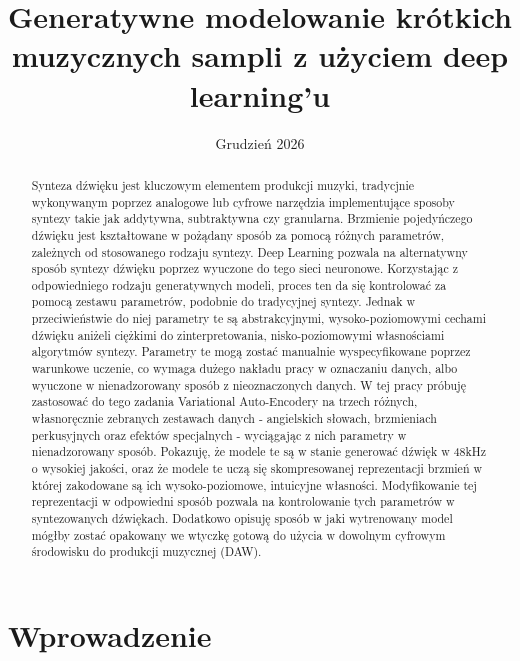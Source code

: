 \documentclass[magisterska]{pracamgr}
\title{Generatywne modelowanie krótkich muzycznych sampli z użyciem deep learning'u}
\date{Grudzień 2026}
\begin{document}
\maketitle

\begin{abstract}
    Synteza dźwięku jest kluczowym elementem produkcji muzyki, tradycjnie wykonywanym poprzez analogowe lub cyfrowe narzędzia implementujące sposoby syntezy takie jak addytywna, subtraktywna czy granularna. Brzmienie pojedyńczego dźwięku jest kształtowane w pożądany sposób za pomocą różnych parametrów, zależnych od stosowanego rodzaju syntezy. Deep Learning pozwala na alternatywny sposób syntezy dźwięku poprzez wyuczone do tego sieci neuronowe. Korzystając z odpowiedniego rodzaju generatywnych modeli, proces ten da się kontrolować za pomocą zestawu parametrów, podobnie do tradycyjnej syntezy. Jednak w przeciwieństwie do niej parametry te są abstrakcyjnymi, wysoko-poziomowymi cechami dźwięku aniżeli ciężkimi do zinterpretowania, nisko-poziomowymi własnościami algorytmów syntezy. Parametry te mogą zostać manualnie wyspecyfikowane poprzez warunkowe uczenie, co wymaga dużego nakładu pracy w oznaczaniu danych, albo wyuczone w nienadzorowany sposób z nieoznaczonych danych. W tej pracy próbuję zastosować do tego zadania Variational Auto-Encodery na trzech różnych, własnoręcznie zebranych zestawach danych - angielskich słowach, brzmieniach perkusyjnych oraz efektów specjalnych - wyciągając z nich parametry w nienadzorowany sposób. Pokazuję, że modele te są w stanie generować dźwięk w 48kHz o wysokiej jakości, oraz że modele te uczą się skompresowanej reprezentacji brzmień w której zakodowane są ich wysoko-poziomowe, intuicyjne własności. Modyfikowanie tej reprezentacji w odpowiedni sposób pozwala na kontrolowanie tych parametrów w syntezowanych dźwiękach. Dodatkowo opisuję sposób w jaki wytrenowany model mógłby zostać opakowany we wtyczkę gotową do użycia w dowolnym cyfrowym środowisku do produkcji muzycznej (DAW).
\end{abstract}

\tableofcontents


\chapter*{Wprowadzenie}\label{r:pojecia}
\end{document}
